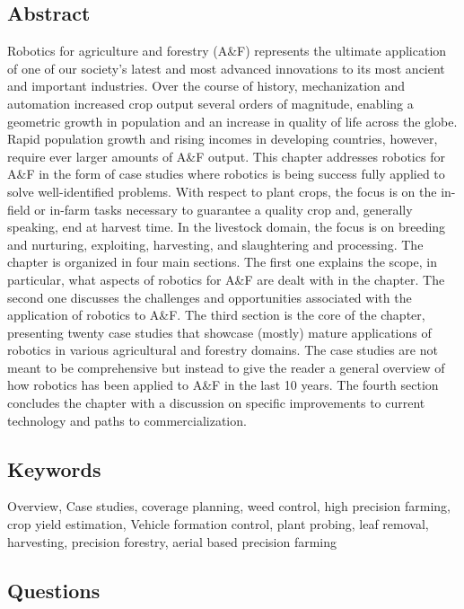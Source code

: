 \documentclass{article}
\begin{document}
\subsection*{Abstract}
Robotics for agriculture and forestry (A\&F) represents the ultimate application of one of our
society’s latest and most advanced innovations to its most ancient and important industries.
Over the course of history, mechanization and automation increased crop output several orders of
magnitude, enabling a geometric growth in population and an increase in quality of life across
the globe. Rapid population growth and rising incomes in developing countries, however, 
require ever larger amounts of A\&F output. This chapter addresses robotics for A\&F in the form
of case studies where robotics is being success fully applied to solve well-identified problems.
With respect to plant crops, the focus is on the in-field or in-farm tasks necessary to guarantee
a quality crop and, generally speaking, end at harvest time. In the livestock domain, the focus
is on breeding and nurturing, exploiting, harvesting, and slaughtering and processing. The chapter
is organized in four main sections. The first one explains the scope, in particular, what aspects
of robotics for A\&F are dealt with in the chapter. The second one discusses the challenges and
opportunities associated with the application of robotics to A\&F. The third section is the core of
the chapter, presenting twenty case studies that showcase (mostly) mature applications of robotics
in various agricultural and forestry domains. The case studies are not meant to be comprehensive 
but instead to give the reader a general overview of how robotics has been applied to
A\&F in the last 10 years. The fourth section concludes the chapter with a discussion on specific
improvements to current technology and paths to commercialization.



\subsection*{Keywords} Overview, Case studies, coverage planning, weed control, high precision farming, crop yield estimation,
Vehicle formation control, plant probing, leaf removal, harvesting, precision forestry, aerial based precision farming

\subsection*{Questions}
\end{document}
